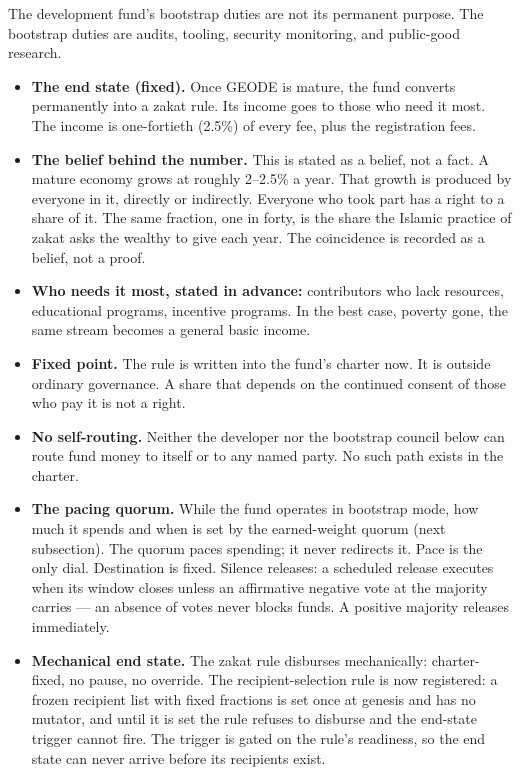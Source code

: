 \documentclass[11pt]{article}
\begin{document}
The development fund's bootstrap duties are not its permanent
purpose. The bootstrap duties are audits, tooling, security
monitoring, and public-good research.
\begin{itemize}
\item \textbf{The end state (fixed).} Once GEODE is mature, the
fund converts permanently into a zakat rule. Its income goes to
those who need it most. The income is one-fortieth (2.5\%) of
every fee, plus the registration fees.
\item \textbf{The belief behind the number.} This is stated as a
belief, not a fact. A mature economy grows at roughly 2--2.5\% a
year. That growth is produced by everyone in it, directly or
indirectly. Everyone who took part has a right to a share of it.
The same fraction, one in forty, is the share the Islamic
practice of zakat asks the wealthy to give each year. The
coincidence is recorded as a belief, not a proof.
\item \textbf{Who needs it most, stated in advance:}
contributors who lack resources, educational programs, incentive
programs. In the best case, poverty gone, the same stream becomes
a general basic income.
\item \textbf{Fixed point.} The rule is written into the fund's
charter now. It is outside ordinary governance. A share that
depends on the continued consent of those who pay it is not a
right.
\item \textbf{No self-routing.} Neither the developer nor the
bootstrap council below can route fund money to itself or to
any named party. No such path exists in the charter.
\item \textbf{The pacing quorum.} While the fund operates in
bootstrap mode, how much it spends and when is set by the
earned-weight quorum (next subsection). The quorum paces
spending; it never redirects it. Pace is the only dial.
Destination is fixed. Silence releases: a scheduled release
executes when its window closes unless an affirmative negative
vote at the majority carries --- an absence of votes never
blocks funds. A positive majority releases immediately.
\item \textbf{Mechanical end state.} The zakat rule disburses
mechanically: charter-fixed, no pause, no override. The
recipient-selection rule is now registered: a frozen recipient
list with fixed fractions is set once at genesis and has no
mutator, and until it is set the rule refuses to disburse and
the end-state trigger cannot fire. The trigger is gated on the
rule's readiness, so the end state can never arrive before its
recipients exist.
\end{itemize}
\end{document}
